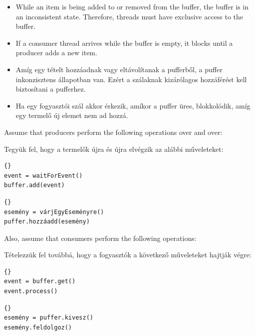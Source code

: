 \documentclass{book}
\begin{document}
\begin{itemize}

\item While an item is being added to or removed from the buffer,
the buffer is in an inconsistent state.  Therefore, threads must
have exclusive access to the buffer.

\item If a consumer thread arrives while the buffer is empty, it
blocks until a producer adds a new item.

\end{itemize}

\begin{itemize}

\item Amíg egy tételt hozzáadnak vagy eltávolítanak a pufferből,
a puffer inkonzisztens állapotban van. Ezért a szálaknak
kizárólagos hozzáférést kell biztosítani a pufferhez.

\item Ha egy fogyasztói szál akkor érkezik, amíkor a puffer üres,
blokkolódik, amíg egy termelő új elemet nem ad hozzá.

\end{itemize}

Assume that producers perform the following operations over and
over:

Tegyük fel, hogy a termelők újra és újra elvégzik az alábbi műveleteket:

\begin{lstlisting}[title={Basic producer code}]{}
event = waitForEvent()
buffer.add(event)
\end{lstlisting}

\begin{lstlisting}[title={Alap termelő kód}]{}
esemény = várjEgyEseményre()
puffer.hozzáadd(esemény)
\end{lstlisting}

Also, assume that consumers perform the following operations:

Tételezzük fel továbbá, hogy a fogyasztók a következő műveleteket hajtják végre:

\begin{lstlisting}[title={Basic consumer code}]{}
event = buffer.get()
event.process()
\end{lstlisting}

\begin{lstlisting}[title={Alap fogyasztó kód}]{}
esemény = puffer.kivesz()
esemény.feldolgoz()
\end{lstlisting}
\end{document}
